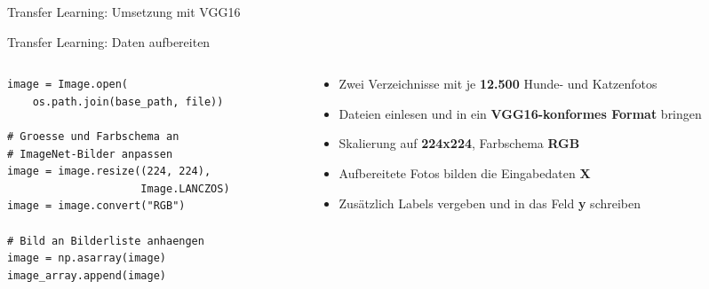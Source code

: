 \begin{frame}{Transfer Learning: Umsetzung mit VGG16}
\begin{center}
\end{center}
\end{frame}


\begin{frame}[fragile]{Transfer Learning: Daten aufbereiten}
\begin{columns}
\begin{column}{0.47\textwidth}
\begin{verbatim}
image = Image.open(
    os.path.join(base_path, file))

# Groesse und Farbschema an
# ImageNet-Bilder anpassen
image = image.resize((224, 224),
                     Image.LANCZOS)
image = image.convert("RGB")

# Bild an Bilderliste anhaengen
image = np.asarray(image)
image_array.append(image)
\end{verbatim}
\end{column}
\begin{column}{0.48\textwidth}
\begin{itemize}
  \item Zwei Verzeichnisse mit je \textbf{12.500} Hunde- und Katzenfotos
  \item Dateien einlesen und in ein \textbf{VGG16-konformes Format} bringen
  \item Skalierung auf \textbf{224x224}, Farbschema \textbf{RGB}
  \item Aufbereitete Fotos bilden die Eingabedaten \textbf{X}
  \item Zusätzlich Labels vergeben und in das Feld \textbf{y} schreiben
\end{itemize}
\end{column}
\end{columns}
\end{frame}

